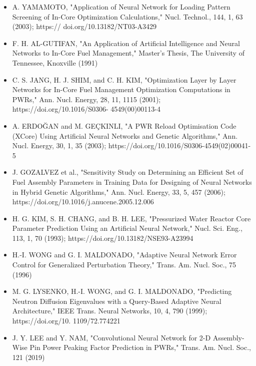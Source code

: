 \documentclass{ar2rc}
\begin{document}
    \begin{itemize} \item A. YAMAMOTO, "Application of Neural Network for
    Loading Pattern Screening of In-Core Optimization Calculations," Nucl.
    Technol., 144, 1, 63 (2003); https:// doi.org/10.13182/NT03-A3429

    \item F. H. AL-GUTIFAN, "An Application of Artificial Intelligence and
    Neural Networks to In-Core Fuel Management," Master's Thesis, The University
    of Tennessee, Knoxville (1991)

    \item C. S. JANG, H. J. SHIM, and C. H. KIM, "Optimization Layer by Layer
    Networks for In-Core Fuel Management Optimization Computations in PWRs,"
    Ann. Nucl. Energy, 28, 11, 1115 (2001); https://doi.org/10.1016/S0306-
    4549(00)00113-4

    \item A. ERDOĞAN and M. GEÇKINLI, "A PWR Reload Optimisation Code (XCore)
    Using Artificial Neural Networks and Genetic Algorithms," Ann. Nucl. Energy,
    30, 1, 35 (2003); https://doi.org/10.1016/S0306-4549(02)00041-5

    \item J. GOZALVEZ et al., "Sensitivity Study on Determining an Efficient Set
    of Fuel Assembly Parameters in Training Data for Designing of Neural
    Networks in Hybrid Genetic Algorithms," Ann. Nucl. Energy, 33, 5, 457
    (2006); https://doi.org/10.1016/j.anucene.2005.12.006

    \item H. G. KIM, S. H. CHANG, and B. H. LEE, "Pressurized Water Reactor Core
    Parameter Prediction Using an Artificial Neural Network," Nucl. Sci. Eng.,
    113, 1, 70 (1993); https://doi.org/10.13182/NSE93-A23994

    \item H.-I. WONG and G. I. MALDONADO, "Adaptive Neural Network Error Control
    for Generalized Perturbation Theory," Trans. Am. Nucl. Soc., 75 (1996)

    \item M. G. LYSENKO, H.-I. WONG, and G. I. MALDONADO, "Predicting Neutron
    Diffusion Eigenvalues with a Query-Based Adaptive Neural Architecture," IEEE
    Trans. Neural Networks, 10, 4, 790 (1999); https://doi.org/10.
    1109/72.774221

    \item J. Y. LEE and Y. NAM, "Convolutional Neural Network for 2-D
    Assembly-Wise Pin Power Peaking Factor Prediction in PWRs," Trans. Am. Nucl.
    Soc., 121 (2019)


\end{itemize}
\end{document}

